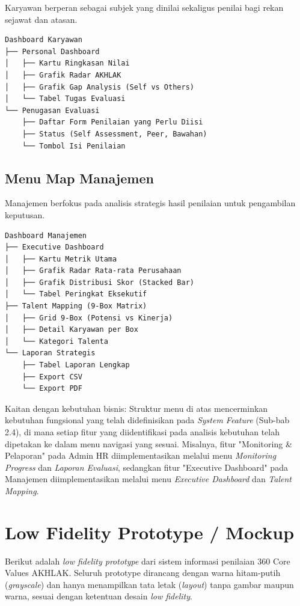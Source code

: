 \documentclass[12pt,a4paper,oneside]{report}
\begin{document}
Karyawan berperan sebagai subjek yang dinilai sekaligus penilai bagi rekan sejawat dan atasan.

\begin{verbatim}
Dashboard Karyawan
├── Personal Dashboard
│   ├── Kartu Ringkasan Nilai
│   ├── Grafik Radar AKHLAK
│   ├── Grafik Gap Analysis (Self vs Others)
│   └── Tabel Tugas Evaluasi
└── Penugasan Evaluasi
    ├── Daftar Form Penilaian yang Perlu Diisi
    ├── Status (Self Assessment, Peer, Bawahan)
    └── Tombol Isi Penilaian
\end{verbatim}

\subsection{Menu Map Manajemen}

Manajemen berfokus pada analisis strategis hasil penilaian untuk pengambilan keputusan.

\begin{verbatim}
Dashboard Manajemen
├── Executive Dashboard
│   ├── Kartu Metrik Utama
│   ├── Grafik Radar Rata-rata Perusahaan
│   ├── Grafik Distribusi Skor (Stacked Bar)
│   └── Tabel Peringkat Eksekutif
├── Talent Mapping (9-Box Matrix)
│   ├── Grid 9-Box (Potensi vs Kinerja)
│   ├── Detail Karyawan per Box
│   └── Kategori Talenta
└── Laporan Strategis
    ├── Tabel Laporan Lengkap
    ├── Export CSV
    └── Export PDF
\end{verbatim}

Kaitan dengan kebutuhan bisnis: Struktur menu di atas mencerminkan kebutuhan fungsional yang telah didefinisikan pada \textit{System Feature} (Sub-bab 2.4), di mana setiap fitur yang diidentifikasi pada analisis kebutuhan telah dipetakan ke dalam menu navigasi yang sesuai. Misalnya, fitur "Monitoring \& Pelaporan" pada Admin HR diimplementasikan melalui menu \textit{Monitoring Progress} dan \textit{Laporan Evaluasi}, sedangkan fitur "Executive Dashboard" pada Manajemen diimplementasikan melalui menu \textit{Executive Dashboard} dan \textit{Talent Mapping}.

\section{Low Fidelity Prototype / Mockup}

Berikut adalah \textit{low fidelity prototype} dari sistem informasi penilaian 360\textdegree{} Core Values AKHLAK. Seluruh prototype dirancang dengan warna hitam-putih (\textit{grayscale}) dan hanya menampilkan tata letak (\textit{layout}) tanpa gambar maupun warna, sesuai dengan ketentuan desain \textit{low fidelity}.
\end{document}
